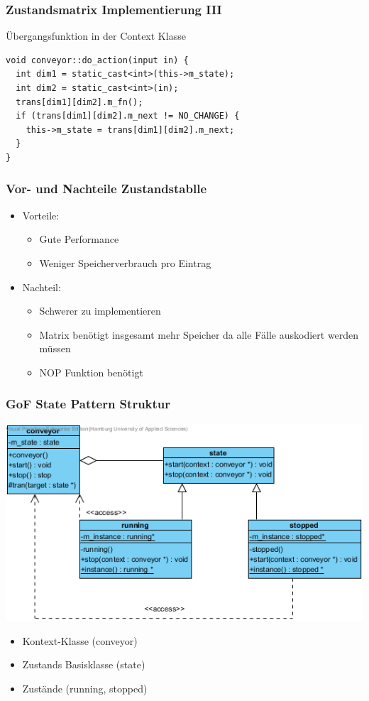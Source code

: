 \documentclass{beamer}
\begin{document}
\begin{frame}[fragile]
 \frametitle{Zustandsmatrix Implementierung III}
 \"Ubergangsfunktion in der Context Klasse
 \begin{lstlisting}
void conveyor::do_action(input in) {
  int dim1 = static_cast<int>(this->m_state);
  int dim2 = static_cast<int>(in);
  trans[dim1][dim2].m_fn();
  if (trans[dim1][dim2].m_next != NO_CHANGE) {
    this->m_state = trans[dim1][dim2].m_next;
  }
}
 \end{lstlisting}
\end{frame}

\begin{frame}
 \frametitle{Vor- und Nachteile Zustandstablle}
 \begin{itemize}
  \item Vorteile:
  \begin{itemize}
   \item Gute Performance
   \item Weniger Speicherverbrauch pro Eintrag
  \end{itemize}
  \item Nachteil:
  \begin{itemize}
   \item Schwerer zu implementieren
   \item Matrix ben\"otigt insgesamt mehr Speicher da alle F\"alle auskodiert werden m\"ussen
   \item NOP Funktion ben\"otigt
  \end{itemize}
 \end{itemize}
\end{frame}

\begin{frame}
 \frametitle{GoF State Pattern Struktur}
 \begin{center}
   \includegraphics[scale=.65]{img/GoF_pure.png}
 \end{center}
 \begin{itemize}
  \item Kontext-Klasse (conveyor)
  \item Zustands Basisklasse (state)
  \item Zust\"ande (running, stopped)
 \end{itemize}
\end{frame}
\end{document}
